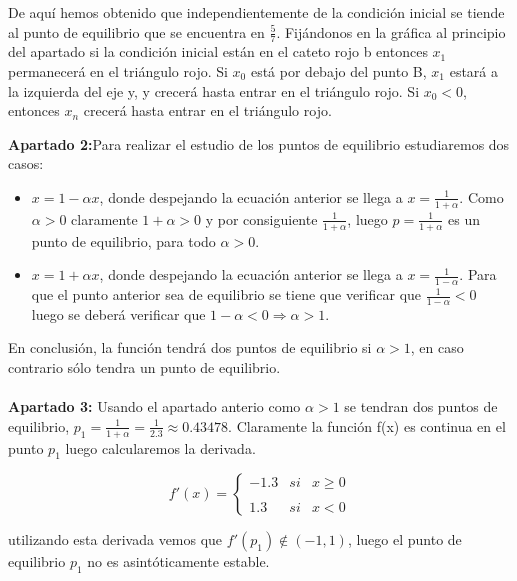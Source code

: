 \documentclass{article}
\begin{document}
De aquí hemos obtenido que independientemente de la condición inicial se tiende al punto de equilibrio que se encuentra en $\frac{5}{7}$. Fijándonos en la gráfica al principio del apartado si la condición inicial están en el cateto rojo b entonces $x_1$ permanecerá en el triángulo rojo. Si $x_0$ está por debajo del punto B, $x_1$ estará a la izquierda del eje y, y crecerá hasta entrar en el triángulo rojo. Si $x_0 < 0$, entonces $x_n$ crecerá hasta entrar en el triángulo rojo.

\textbf{Apartado 2:}Para realizar el estudio de los puntos de equilibrio estudiaremos dos casos:

\begin{itemize}
\item $x = 1 - \alpha x$, donde despejando la ecuación anterior se llega a $x = \frac{1}{1+\alpha}$. Como $\alpha > 0$ claramente $1 + \alpha > 0$ y por consiguiente $\frac{1}{1+\alpha}$, luego $p = \frac{1}{1 + \alpha}$ es un punto de equilibrio, para todo $\alpha > 0$.

\item $x = 1 + \alpha x$, donde despejando la ecuación anterior se llega a $x = \frac{1}{1 - \alpha}$. Para que el punto anterior sea de equilibrio se tiene que verificar que $\frac{1}{1 - \alpha} < 0$ luego se deberá verificar que $1 - \alpha < 0 \Rightarrow \alpha > 1$.
\end{itemize}

En conclusión, la función tendrá dos puntos de equilibrio si $\alpha > 1$, en caso contrario sólo tendra un punto de equilibrio. \\ \\

\textbf{Apartado 3:} Usando el apartado anterio como $\alpha > 1$ se tendran dos puntos de equilibrio, $p_1 = \frac{1}{1 + \alpha} = \frac{1}{2.3} \approx 0.43478$. Claramente la función f(x) es continua en el punto $p_1$ luego calcularemos la derivada.

\begin{equation*}
f'(x)= \left\{ \begin{array}{lcc}
             -1.3 &   si  & x \geq 0 \\
             \\ 1.3 &  si & x < 0
             \end{array}
   \right.
\end{equation*}

utilizando esta derivada vemos que $f'(p_1) \notin (-1,1)$, luego el punto de equilibrio $p_1$ no es asintóticamente estable. \\
\end{document}
